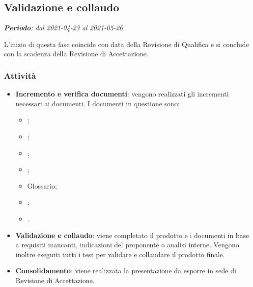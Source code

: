 \subsection{Validazione e collaudo}
\textit{\textbf{Periodo}: dal 2021-04-23 al 2021-05-26}

L'inizio di questa fase coincide con data della Revisione di Qualifica e si conclude con la scadenza della Revisione di Accettazione.

\subsubsection{Attività}

\begin{itemize}
\item \textbf{Incremento e verifica documenti}: vengono realizzati gli incrementi necessari ai documenti. I documenti in questione sono:
\begin{itemize}
\item \NdP{};
\item \AdR{};
\item \PdQ{};
\item \PdP{};
\item Glossario;
\item \MU{};
\item \MM{}.
\end{itemize}
\item \textbf{Validazione e collaudo}: viene completato il prodotto e i documenti in base a requisiti mancanti, indicazioni del proponente o analisi interne. Vengono inoltre eseguiti tutti i test per validare e collaudare il prodotto finale.
\item \textbf{Consolidamento}: viene realizzata la presentazione da esporre in sede di Revisione di Accettazione.
\end{itemize}



